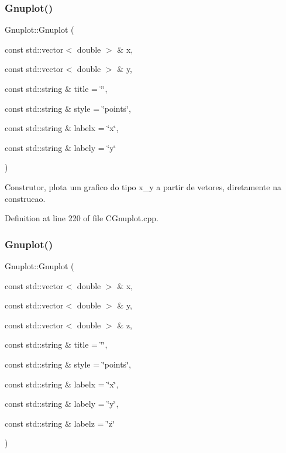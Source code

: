 \subsubsection{\texorpdfstring{Gnuplot()}{Gnuplot()}\hspace{0.1cm}{\footnotesize\ttfamily [3/4]}}
{\footnotesize\ttfamily Gnuplot\+::\+Gnuplot (\begin{DoxyParamCaption}\item[{const std\+::vector$<$ double $>$ \&}]{x,  }\item[{const std\+::vector$<$ double $>$ \&}]{y,  }\item[{const std\+::string \&}]{title = {\ttfamily \char`\"{}\char`\"{}},  }\item[{const std\+::string \&}]{style = {\ttfamily \char`\"{}points\char`\"{}},  }\item[{const std\+::string \&}]{labelx = {\ttfamily \char`\"{}x\char`\"{}},  }\item[{const std\+::string \&}]{labely = {\ttfamily \char`\"{}y\char`\"{}} }\end{DoxyParamCaption})}



Construtor, plota um grafico do tipo x\+\_\+y a partir de vetores, diretamente na construcao. 



Definition at line 220 of file C\+Gnuplot.\+cpp.

\mbox{\label{class_gnuplot_a14191e89154f2716608f6907975cc012}} 
\subsubsection{\texorpdfstring{Gnuplot()}{Gnuplot()}\hspace{0.1cm}{\footnotesize\ttfamily [4/4]}}
{\footnotesize\ttfamily Gnuplot\+::\+Gnuplot (\begin{DoxyParamCaption}\item[{const std\+::vector$<$ double $>$ \&}]{x,  }\item[{const std\+::vector$<$ double $>$ \&}]{y,  }\item[{const std\+::vector$<$ double $>$ \&}]{z,  }\item[{const std\+::string \&}]{title = {\ttfamily \char`\"{}\char`\"{}},  }\item[{const std\+::string \&}]{style = {\ttfamily \char`\"{}points\char`\"{}},  }\item[{const std\+::string \&}]{labelx = {\ttfamily \char`\"{}x\char`\"{}},  }\item[{const std\+::string \&}]{labely = {\ttfamily \char`\"{}y\char`\"{}},  }\item[{const std\+::string \&}]{labelz = {\ttfamily \char`\"{}z\char`\"{}} }\end{DoxyParamCaption})}




